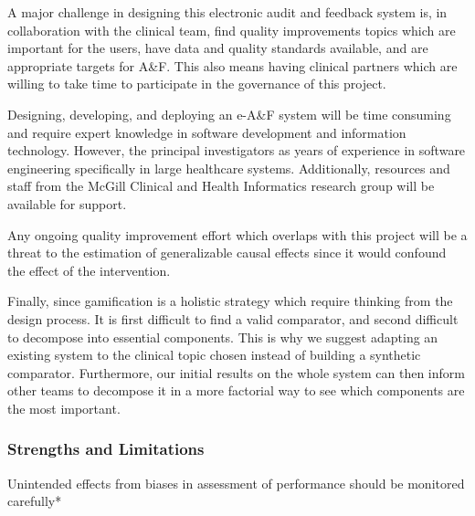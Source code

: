 A major challenge in designing this electronic audit and feedback system is, in collaboration with the clinical team, find quality improvements topics which are important for the users, have data and quality standards available, and are appropriate targets for A\&F. This also means having clinical partners which are willing to take time to participate in the governance of this project.

Designing, developing, and deploying an e-A\&F system will be time consuming and require expert knowledge in software development and information technology. However, the principal investigators as years of experience in software engineering specifically in large healthcare systems. Additionally, resources and staff from the McGill Clinical and Health Informatics research group will be available for support.

Any ongoing quality improvement effort which overlaps with this project will be a threat to the estimation of generalizable causal effects since it would confound the effect of the intervention.

Finally, since gamification is a holistic strategy which require thinking from the design process. It is first difficult to find a valid comparator, and second difficult to decompose into essential components. This is why we suggest adapting an existing system to the clinical topic chosen instead of building a synthetic comparator. Furthermore, our initial results on the whole system can then inform other teams to decompose it in a more factorial way to see which components are the most important. 

\subsubsection{Strengths and Limitations}

Unintended effects from biases in assessment of performance should be monitored carefully*\cite{terris2009attribution}

